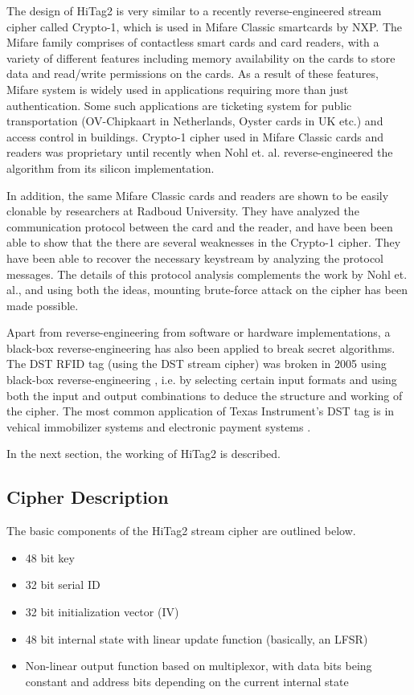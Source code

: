 The design of HiTag2 is very similar to a recently reverse-engineered \cite{NohlESP-2008-usenix} stream cipher called Crypto-1, which is used in Mifare Classic smartcards by NXP. The Mifare family comprises of contactless smart cards and card readers, with a variety of different features including memory availability on the cards to store data and read/write permissions on the cards. As a result of these features, Mifare system is widely used in applications requiring more than just authentication. Some such applications are ticketing system for public transportation (OV-Chipkaart in Netherlands, Oyster cards in UK etc.) and access control in buildings. Crypto-1 cipher used in Mifare Classic cards and readers was proprietary until recently when Nohl et. al. \cite{NohlESP-2008-usenix} reverse-engineered the algorithm from its silicon implementation.

In addition, the same Mifare Classic cards and readers are shown to be easily clonable \cite{dekoninggans2008pam} by researchers at Radboud University. They have analyzed the communication protocol between the card and the reader, and have been been able to show that the there are several weaknesses in the Crypto-1 cipher. They have been able to recover the necessary keystream by analyzing the protocol messages. The details of this protocol analysis complements the work by Nohl et. al., and using both the ideas, mounting brute-force attack on the cipher has been made possible. 

Apart from reverse-engineering from software or hardware implementations, a black-box reverse-engineering has also been applied to break secret algorithms. The DST RFID tag (using the DST stream cipher) was broken in 2005 using black-box reverse-engineering \cite{bono2005sac}, i.e. by selecting certain input formats and using both the input and output combinations to deduce the structure and working of the cipher. The most common application of Texas Instrument's DST tag is in vehical immobilizer systems and electronic payment systems \cite{dst-rfid-analysis}. 

In the next section, the working of HiTag2 is described.

\subsection{Cipher Description}
The basic components of the HiTag2 stream cipher are outlined below.
\begin{itemize}
\item 48 bit key
\item 32 bit serial ID
\item 32 bit initialization vector (IV)
\item 48 bit internal state with linear update function (basically, an LFSR)
\item Non-linear output function based on multiplexor, with data bits being constant and address bits depending on the current internal state
\end{itemize}

